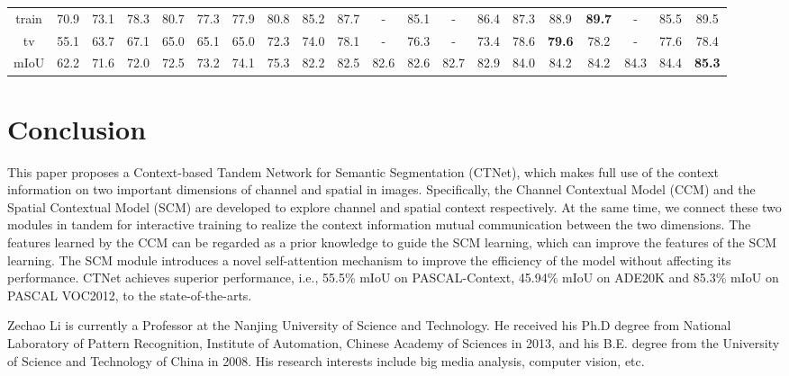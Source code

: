 \documentclass[10pt,journal,cspaper,compsoc]{IEEEtran}
\begin{document}
\begin{table*}[t]
\begin{tabular}{c|c|c|c|c|c|c|c|c|c|c|c|c|c|c|c|c|c|c|c}
			train & 70.9 & 73.1 & 78.3 & 80.7 & 77.3 & 77.9 & 80.8 & 85.2 & 87.7 & - & 85.1 & - & 86.4 & 87.3 & 88.9 & \textbf{89.7} & - & 85.5 & 89.5 \\
			
			tv & 55.1 & 63.7 & 67.1 & 65.0 & 65.1 & 65.0 & 72.3 & 74.0 & 78.1 & - & 76.3 & - & 73.4 & 78.6 & \textbf{79.6} & 78.2 & - & 77.6 & 78.4 \\
			\hline
			mIoU & 62.2 & 71.6 & 72.0 & 72.5 & 73.2 & 74.1 & 75.3 & 82.2 & 82.5 & 82.6 & 82.6 & 82.7 & 82.9 & 84.0 & 84.2 & 84.2 & 84.3 & 84.4 & \textbf{85.3} \\
			\hline
	\end{tabular}
\end{table*}
	
\section{Conclusion}
This paper proposes a Context-based Tandem Network for Semantic Segmentation (CTNet), which makes full use of the context information on two important dimensions of channel and spatial in images. Specifically, the Channel Contextual Model (CCM) and the Spatial Contextual Model (SCM) are developed to explore channel and spatial context respectively. At the same time, we connect these two modules in tandem for interactive training to realize the context information mutual communication between the two dimensions. The features learned by the CCM can be regarded as a prior knowledge to guide the SCM learning, which can improve the features of the SCM learning. The SCM module introduces a novel self-attention mechanism to improve the efficiency of the model without affecting its performance. CTNet achieves superior performance, i.e., 55.5\% mIoU on PASCAL-Context, 45.94\% mIoU on ADE20K and 85.3\% mIoU on PASCAL VOC2012, to the state-of-the-arts.
	
	


	
	


	
	
\begin{IEEEbiography} {Zechao Li} is currently a Professor at the Nanjing University of Science and Technology. He received his Ph.D degree from National Laboratory of Pattern Recognition, Institute of Automation, Chinese Academy of Sciences in 2013, and his B.E. degree from the University of Science and Technology of China in 2008. His research interests include big media analysis, computer vision, etc.
\end{IEEEbiography}
	
\end{document}
